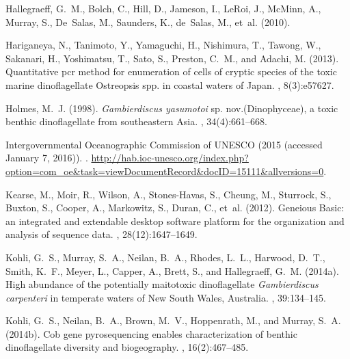 \documentclass[10pt,letterpaper]{article}
\begin{document}
\begin{thebibliography}{10}
Hallegraeff, G.~M., Bolch, C., Hill, D., Jameson, I., LeRoi, J., McMinn, A.,
  Murray, S., De~Salas, M., Saunders, K., de~Salas, M., et~al. (2010).

Hariganeya, N., Tanimoto, Y., Yamaguchi, H., Nishimura, T., Tawong, W.,
  Sakanari, H., Yoshimatsu, T., Sato, S., Preston, C.~M., and Adachi, M.
  (2013).
\newblock Quantitative pcr method for enumeration of cells of cryptic species
  of the toxic marine dinoflagellate {O}streopsis spp. in coastal waters of
  {J}apan.
, 8(3):e57627.

Holmes, M.~J. (1998).
\newblock \emph{Gambierdiscus yasumotoi} sp. nov.({D}inophyceae), a toxic
  benthic dinoflagellate from southeastern {A}sia.
, 34(4):661--668.

{Intergovernmental Oceanographic Commission of UNESCO} (2015 (accessed January
  7, 2016)).
.
\newblock
  \url{http://hab.ioc-unesco.org/index.php?option=com_oe&task=viewDocumentRecord&docID=15111&allversions=0}.

Kearse, M., Moir, R., Wilson, A., Stones-Havas, S., Cheung, M., Sturrock, S.,
  Buxton, S., Cooper, A., Markowitz, S., Duran, C., et~al. (2012).
\newblock Geneious {B}asic: an integrated and extendable desktop software
  platform for the organization and analysis of sequence data.
, 28(12):1647--1649.

Kohli, G.~S., Murray, S.~A., Neilan, B.~A., Rhodes, L.~L., Harwood, D.~T.,
  Smith, K.~F., Meyer, L., Capper, A., Brett, S., and Hallegraeff, G.~M.
  (2014a).
\newblock High abundance of the potentially maitotoxic dinoflagellate
  \emph{Gambierdiscus carpenteri} in temperate waters of {N}ew {S}outh {W}ales,
  {A}ustralia.
, 39:134--145.

Kohli, G.~S., Neilan, B.~A., Brown, M.~V., Hoppenrath, M., and Murray, S.~A.
  (2014b).
\newblock Cob gene pyrosequencing enables characterization of benthic
  dinoflagellate diversity and biogeography.
, 16(2):467--485.


\end{thebibliography}
\end{document}
